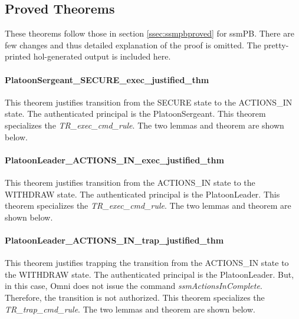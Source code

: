 \documentclass[../../main/main.tex]{subfiles}
\begin{document}
\HOLConductORPDefDefinitionssecHelperXXdef


\subsection{Proved Theorems}
These theorems follow those in section \ref{ssec:ssmpbproved} for ssmPB.  There are few changes and thus detailed explanation of the proof is omitted.  The pretty-printed \gls{hol}-generated output is included here.

\paragraph*{PlatoonSergeant_SECURE_exec_justified_thm}
This theorem justifies transition from the SECURE state to the ACTIONS_IN  state.  The authenticated principal is the PlatoonSergeant.  This theorem specializes the \textit{TR_exec_cmd_rule}.  The two lemmas and theorem are shown below.

\HOLssmConductORPTheoremsPlatoonSergeantXXSECUREXXexecXXlemma
{}\HOLssmConductORPTheoremsPlatoonSergeantXXSECUREXXexecXXjustifiedXXlemma
\HOLssmConductORPTheoremsPlatoonSergeantXXSECUREXXexecXXjustifiedXXthm

\paragraph*{PlatoonLeader_ACTIONS_IN_exec_justified_thm}
This theorem justifies transition from the ACTIONS_IN state to the WITHDRAW state.  The authenticated principal is the PlatoonLeader.  This theorem specializes the \textit{TR_exec_cmd_rule}.  The two lemmas and theorem are shown below.

\HOLssmConductORPTheoremsPlatoonLeaderXXACTIONSXXINXXexecXXlemma
\HOLssmConductORPTheoremsPlatoonLeaderXXACTIONSXXINXXexecXXjustifiedXXlemma
\HOLssmConductORPTheoremsPlatoonLeaderXXACTIONSXXINXXexecXXjustifiedXXthm

\paragraph*{PlatoonLeader_ACTIONS_IN_trap_justified_thm}
This theorem justifies trapping the transition from the ACTIONS_IN state to the WITHDRAW state.  The authenticated principal is the PlatoonLeader.  But, in this case, Omni does not issue the command \textit{ssmActionsInComplete}.  Therefore, the transition is not authorized.  This theorem specializes the \textit{TR_trap_cmd_rule}.  The two lemmas and theorem are shown below.
\end{document}
